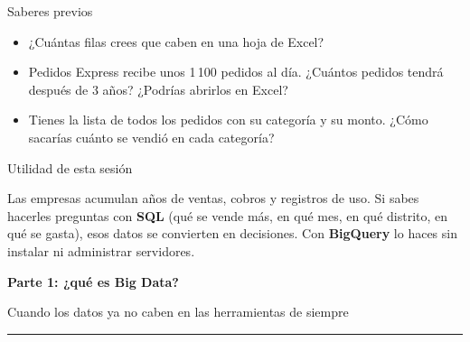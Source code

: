 \documentclass[aspectratio=169,10pt,c]{beamer}
\newcommand{\separador}[2]{%
\begin{frame}[plain]
\vfill
\begin{center}
{\fontsize{29}{34}\selectfont\bfseries #1}\par
\vspace{2mm}
{\small #2}\par
\vspace{4mm}
{\color{utpRojo}\rule{8.5cm}{1.2pt}}
\end{center}
\vfill
\end{frame}}
\begin{document}
\begin{frame}{Saberes previos}
\begin{itemize}\setlength\itemsep{11pt}
  \item ¿Cuántas filas crees que caben en una hoja de Excel?
  \item Pedidos Express recibe unos 1\,100 pedidos al día. ¿Cuántos pedidos tendrá después de 3 años? ¿Podrías abrirlos en Excel?
  \item Tienes la lista de todos los pedidos con su categoría y su monto. ¿Cómo sacarías cuánto se vendió en cada categoría?
\end{itemize}
\end{frame}

\begin{frame}[c]{Utilidad de esta sesión}
\begin{center}
\begin{minipage}{.84\textwidth}
{\large Las empresas acumulan años de ventas, cobros y registros de uso. Si sabes hacerles preguntas con \textbf{SQL} (qué se vende más, en qué mes, en qué distrito, en qué se gasta), esos datos se convierten en decisiones. Con \textbf{BigQuery} lo haces sin instalar ni administrar servidores.}
\end{minipage}
\end{center}
\end{frame}

\separador{Parte 1: ¿qué es Big Data?}{Cuando los datos ya no caben en las herramientas de siempre}
\end{document}
